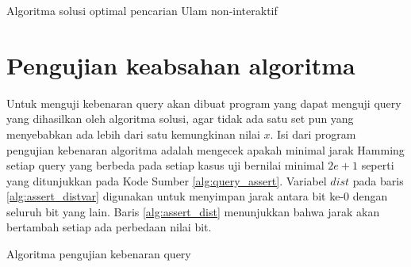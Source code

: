 \begin{algorithm}[h]
\caption{Algoritma solusi optimal pencarian Ulam non-interaktif}
\label{alg:guessn5_lookup}
\Fn{lookup\_binary\_code($M$, $e$)}{
\KwData{$M$ search space, $e$ max lies allowed}
\KwResult{$queries$}
  $queries = [\ ]$\;
  $the\_real\_M = M$\;
  $m = \text{ceil}(\log_2(M))$\;
  $M = 2^m$\;
  $d = (2e + 1)$\;
  $minimal[d] = [\ ]$\;
  $distances[M] = [\ ]$\;
  $code\_order$ = preloaded exhaustive\_search($2 \leq 2^m \leq 4096$, $16$)\;

  \For{$i = 0$ \KwTo $M-1$}{
    $min = \infty$\;
    $query = \text{generate\_query}(M, code\_order[m][i])$\;
    update the $distances$ after $query$\;
    $min$ = min($distances$)\;
    $queries$.push($query$.substr($the\_real\_M$))\;
    \lIf{$min \geq d$}{break}
  }

  \Return $queries$\;
}
\end{algorithm}


\section{Pengujian keabsahan algoritma}

Untuk menguji kebenaran query akan dibuat program yang dapat menguji query yang dihasilkan oleh algoritma solusi, agar tidak ada satu set pun yang menyebabkan ada lebih dari satu kemungkinan nilai $x$. Isi dari program pengujian kebenaran algoritma adalah mengecek apakah minimal jarak Hamming setiap query yang berbeda pada setiap kasus uji bernilai minimal $2e+1$ seperti yang ditunjukkan pada Kode Sumber \ref{alg:query_assert}. Variabel $dist$ pada baris \ref{alg:assert_distvar} digunakan untuk menyimpan jarak antara bit ke-0 dengan seluruh bit yang lain. Baris \ref{alg:assert_dist} menunjukkan bahwa jarak akan bertambah setiap ada perbedaan nilai bit.

\begin{algorithm}[h]
\caption{Algoritma pengujian kebenaran query}
\label{alg:query_assert}
\end{algorithm}


